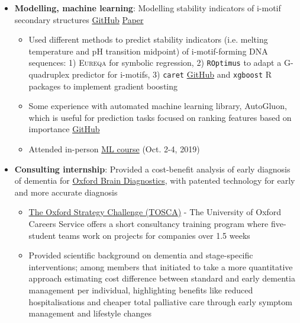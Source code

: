 \documentclass[a4paper,11pt]{article}
\newcommand{\resumeItem}[2]{
  \item\small{
    \textbf{#1}{: #2 \vspace{-2pt}}
  }
}
\newcommand{\resumeItemListStart}{\begin{itemize}}
\newcommand{\resumeItemListEnd}{\end{itemize}\vspace{-5pt}}
\begin{document}
            \resumeItemListStart
                \resumeItem{Modelling, machine learning}{Modelling stability indicators of i-motif secondary structures \href{https://github.com/SahakyanLab/iMotif_dev}{GitHub} \href{https://doi.org/10.1002/anie.202016801}{Paper}}
                    \begin{itemize}
                        \item {Used different methods to predict stability indicators (i.e. melting temperature and pH transition midpoint) of i-motif-forming DNA sequences: 1) \textsc{Eureqa} for symbolic regression, 2) \texttt{ROptimus} to adapt a G-quadruplex predictor for i-motifs, 3) \texttt{caret} \href{https://github.com/liezeltamon/ml-lib}{GitHub} and \texttt{xgboost} R packages to implement gradient boosting}
                        \item {Some experience with automated machine learning library, AutoGluon, which is useful for prediction tasks focused on ranking features based on importance \href{https://github.com/liezeltamon/predicting-contact-variability/tree/main}{GitHub}}
                        \item {Attended in-person \href{https://training.cam.ac.uk/course/bioinfo-ml}{ML course} (Oct. 2-4, 
                        2019)}
                    \end{itemize}
            \resumeItemListEnd
            
            \resumeItemListStart
                \resumeItem{Consulting internship}{Provided a cost-benefit analysis of early diagnosis of dementia for \href{https://www.oxfordbraindiagnostics.com/}{Oxford Brain Diagnostics}, with patented technology for early and more accurate diagnosis}
                    \begin{itemize}
                        \item {\href{https://www.careers.ox.ac.uk/oxford-strategy-challenge}{The Oxford Strategy Challenge (TOSCA)} - The University of Oxford Careers Service offers a short consultancy training program where five-student teams work on projects for companies over 1.5 weeks}
                        \item {Provided scientific background on dementia and stage-specific interventions; among members that initiated to take a more quantitative approach estimating cost difference between standard and early dementia management per individual, highlighting benefits like reduced hospitalisations and cheaper total palliative care through early symptom management and lifestyle changes}
                    \end{itemize}
            \resumeItemListEnd
    
\end{document}
